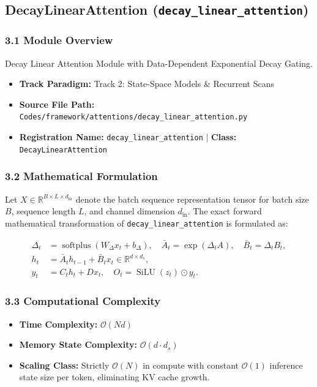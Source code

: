 \subsection{DecayLinearAttention (\texttt{decay\_linear\_attention})}
\label{sec:app_module_decay_linear_attention}

\subsubsection*{3.1 Module Overview}
Decay Linear Attention Module with Data-Dependent Exponential Decay Gating.
\begin{itemize}
    \item \textbf{Track Paradigm:} Track 2: State-Space Models \& Recurrent Scans
    \item \textbf{Source File Path:} \texttt{Codes/framework/attentions/decay\_linear\_attention.py}
    \item \textbf{Registration Name:} \texttt{decay\_linear\_attention} $\mid$ \textbf{Class:} \texttt{DecayLinearAttention}
\end{itemize}

\subsubsection*{3.2 Mathematical Formulation}
Let $X \in \mathbb{R}^{B \times L \times d_{\text{in}}}$ denote the batch sequence representation tensor for batch size $B$, sequence length $L$, and channel dimension $d_{\text{in}}$. The exact forward mathematical transformation of \texttt{decay\_linear\_attention} is formulated as:

\begin{align}
\Delta_t &= \operatorname{softplus}(W_\Delta x_t + b_\Delta), \quad \bar{A}_t = \exp(\Delta_t A), \quad \bar{B}_t = \Delta_t B_t, \\
h_t &= \bar{A}_t h_{t-1} + \bar{B}_t x_t \in \mathbb{R}^{d \times d_s}, \\
y_t &= C_t h_t + D x_t, \quad O_t = \operatorname{SiLU}(z_t) \odot y_t.
\end{align}


\subsubsection*{3.3 Computational Complexity}
\begin{itemize}
    \item \textbf{Time Complexity:} $\mathcal{O}(N d)$
    \item \textbf{Memory State Complexity:} $\mathcal{O}(d \cdot d_s)$
    \item \textbf{Scaling Class:} Strictly $\mathcal{O}(N)$ in compute with constant $\mathcal{O}(1)$ inference state size per token, eliminating KV cache growth.
\end{itemize}

